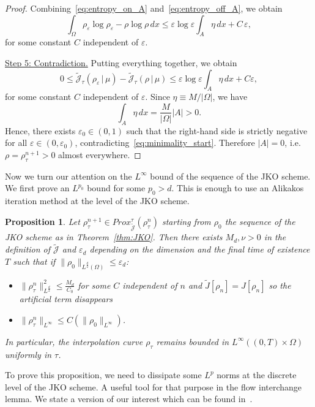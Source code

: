 \documentclass[a4paper,twosided, 11pt]{article}
\newcommand{\eps}{\varepsilon}
\theoremstyle{plain}
\newtheorem{proposition}[thm]{Proposition}
\theoremstyle{remark}
\numberwithin{equation}{section}
\begin{document}
{\begin{proof}
Combining~\eqref{eq:entropy_on_A} and~\eqref{eq:entropy_off_A}, we obtain
\begin{equation}\label{eq:entropy_total}
\int_\Omega \rho_\varepsilon\log\rho_\varepsilon-\rho\log\rho\,dx
\le
\varepsilon\log\varepsilon\int_A \eta\,dx + C\,\varepsilon,
\end{equation}
for some constant $C$ independent of $\varepsilon$.

\medskip
\underline{Step 5: Contradiction.}
Putting everything together, we obtain
\[
0\le
\widetilde{\mathcal J}_\tau(\rho_\varepsilon\,|\,\mu)-\widetilde{\mathcal J}_\tau(\rho\,|\,\mu)
\le
\varepsilon\log\varepsilon\int_A \eta\,dx + C\varepsilon,
\]
for some constant $C$ independent of $\varepsilon$. Since $\eta\equiv M/|\Omega|$, we have
\[
\int_A \eta\,dx=\frac{M}{|\Omega|}|A|>0.
\]
Hence, there exists $\varepsilon_0\in(0,1)$ such that the right-hand side is strictly negative for all
$\varepsilon\in(0,\varepsilon_0)$, contradicting~\eqref{eq:minimality_start}.
Therefore $|A|=0$, i.e.\ $\rho=\rho_\tau^{n+1}>0$ almost everywhere.
\end{proof}

Now we turn our attention on the $L^{\infty}$ bound of the sequence of the JKO scheme. We first prove an $L^{p_0}$ bound for some $p_0>d$. This is enough to use an Alikakos iteration method at the level of the JKO scheme.

\begin{proposition}\label{lem:Linfty_JKO}
 Let  $\rho^{n+1}_{\tau}\in Prox_{\widetilde{\mathcal{J}}}^{\tau}(\rho^{n}_{\tau})$ starting from $\rho_0$ the sequence of the JKO scheme as in Theorem~\ref{thm:JKO}. Then there exists  $M_d,\nu >0$ in the definition of $\widetilde{\mathcal{J}}$  and $\eps_{d}$ depending on the dimension and the final time of existence $T$ such that if $\|\rho_0\|_{L^{\frac{d}{2}}(\Omega)}\le \eps_d$:
\begin{itemize}
    \item $\|\rho_{\tau}^{n}\|_{L^{\frac d2}}^2\le \frac{M_d}{C_0}$ for some $C$ independent of $n$ and $\widetilde{J}[\rho_n]=J[\rho_n]$ so the artificial term disappears
    \item $\|\rho^{n}_{\tau}\|_{L^{\infty}}\le C(\|\rho_{0}\|_{L^{\infty}})$.
\end{itemize}
In particular, the interpolation curve $\rho_{\tau}$ remains bounded in $L^{\infty}((0,T)\times\Omega)$ uniformly in $\tau$.     
\end{proposition}


To prove this proposition, we need to dissipate some $L^p$ norms at the discrete level of the JKO scheme. A useful tool for that purpose in the flow interchange lemma. We state a version of our interest which can be found in~\cite{dimarino}. 

}
\end{document}
